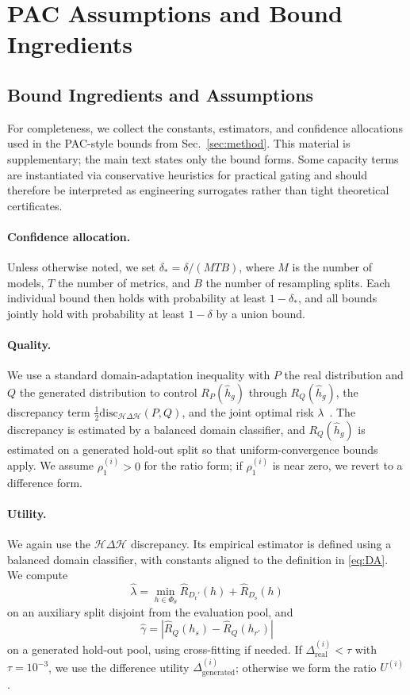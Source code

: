 \section{PAC Assumptions and Bound Ingredients}
\label{app:theory-assumptions}

\subsection{Bound Ingredients and Assumptions}
\label{app:bound-ingredients}

For completeness, we collect the constants, estimators, and confidence allocations used in the PAC-style bounds from Sec.~\ref{sec:method}. This material is supplementary; the main text states only the bound forms. Some capacity terms are instantiated via conservative heuristics for practical gating and should therefore be interpreted as engineering surrogates rather than tight theoretical certificates.

\paragraph{Confidence allocation.}
Unless otherwise noted, we set $\delta_*=\delta/(MTB)$, where $M$ is the number
of models, $T$ the number of metrics, and $B$ the number of resampling splits. Each individual bound then holds with probability at least $1-\delta_*$, and all bounds jointly hold with probability at least $1-\delta$ by a union bound.

\paragraph{Quality.}
We use a standard domain-adaptation inequality with $P$ the real distribution and $Q$ the generated distribution to control $R_P(\hat h_g)$ through $R_Q(\hat h_g)$, the discrepancy term $\tfrac12\mathrm{disc}_{\mathcal H\Delta\mathcal H}(P,Q)$, and the joint optimal risk $\lambda$~\citep{ben2010theory,blitzer2007biographies}. The discrepancy is estimated by a balanced domain classifier, and $R_Q(\hat h_g)$ is estimated on a generated hold-out split so that uniform-convergence bounds apply. We assume $\rho_1^{(i)}>0$ for the ratio form; if $\rho_1^{(i)}$ is near zero, we revert to a difference form.

\paragraph{Utility.}
We again use the $\mathcal H\!\Delta\!\mathcal H$ discrepancy. Its empirical estimator is defined using a balanced domain classifier, with constants aligned to the definition in \eqref{eq:DA}. We compute
\[
\widehat\lambda = \min_{h\in\Phi_\theta}\widehat R_{D_{\mathrm r}'}(h)+\widehat R_{D_{\mathrm s}}(h)
\]
on an auxiliary split disjoint from the evaluation pool, and
\[
\hat\gamma=|\hat R_Q(h_s)-\hat R_Q(h_{r'})|
\]
on a generated hold-out pool, using cross-fitting if needed. If
$\Delta_{\text{real}}^{(i)}<\tau$ with $\tau=10^{-3}$, we use the difference utility $\Delta_{\text{generated}}^{(i)}$; otherwise we form the ratio $U^{(i)}$.

